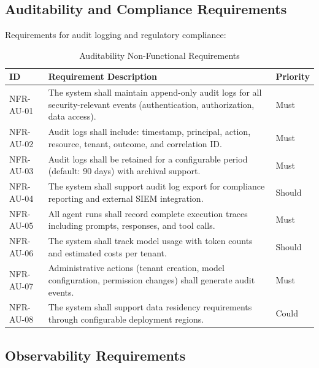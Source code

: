 \subsection{Auditability and Compliance Requirements}
\label{subsec:nfr-audit}

Requirements for audit logging and regulatory compliance:

\begin{table}[htbp]
\centering
\caption{Auditability Non-Functional Requirements}
\label{tab:nfr-audit}
\small
\begin{tabularx}{\textwidth}{|l|X|l|}
\hline
\textbf{ID} & \textbf{Requirement Description} & \textbf{Priority} \\
\hline
NFR-AU-01 & The system shall maintain append-only audit logs for all security-relevant events (authentication, authorization, data access). & Must \\
\hline
NFR-AU-02 & Audit logs shall include: timestamp, principal, action, resource, tenant, outcome, and correlation ID. & Must \\
\hline
NFR-AU-03 & Audit logs shall be retained for a configurable period (default: 90 days) with archival support. & Must \\
\hline
NFR-AU-04 & The system shall support audit log export for compliance reporting and external SIEM integration. & Should \\
\hline
NFR-AU-05 & All agent runs shall record complete execution traces including prompts, responses, and tool calls. & Must \\
\hline
NFR-AU-06 & The system shall track model usage with token counts and estimated costs per tenant. & Should \\
\hline
NFR-AU-07 & Administrative actions (tenant creation, model configuration, permission changes) shall generate audit events. & Must \\
\hline
NFR-AU-08 & The system shall support data residency requirements through configurable deployment regions. & Could \\
\hline
\end{tabularx}
\end{table}

\subsection{Observability Requirements}
\label{subsec:nfr-observability}

